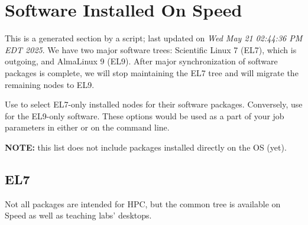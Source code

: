 \section{Software Installed On Speed}
\label{sect:software-list}

This is a generated section by a script; last updated on \textit{Wed May 21 02:44:36 PM EDT 2025}.
We have two major software trees: Scientific Linux 7 (EL7), which is
outgoing, and AlmaLinux 9 (EL9). After major synchronization of software
packages is complete, we will stop maintaining the EL7 tree and
will migrate the remaining nodes to EL9.

Use  to select EL7-only installed nodes for their
software packages. Conversely, use  for the EL9-only
software. These options would be used as a part of your job parameters
in either  or on the command line.

\noindent
\textbf{NOTE:} this list does not include packages installed directly on the OS (yet).

\subsection{EL7}
\label{sect:software-el7}

Not all packages are intended for HPC, but the common tree is available
on Speed as well as teaching labs' desktops.

